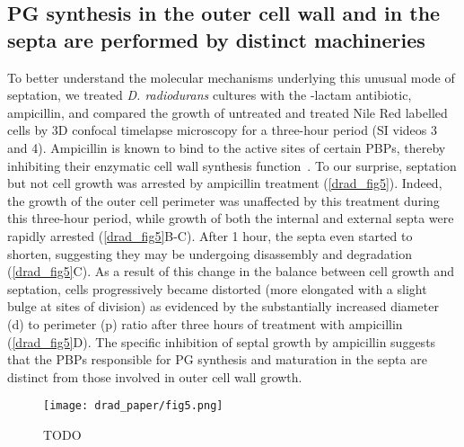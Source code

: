 \FloatBarrier

\subsection{PG synthesis in the outer cell wall and in the septa are performed by distinct machineries}

To better understand the molecular mechanisms underlying this unusual mode of septation, we treated \textit{D. radiodurans} cultures with the \beta-lactam antibiotic, ampicillin, and compared the growth of untreated and treated Nile Red labelled cells by 3D confocal timelapse microscopy for a three-hour period (SI videos 3 and 4).
Ampicillin is known to bind to the active sites of certain PBPs, thereby inhibiting their enzymatic cell wall synthesis function~\cite{sauvageGlycosyltransferasesTranspeptidasesPenicillinBinding2016}.
To our surprise, septation but not cell growth was arrested by ampicillin treatment (\autoref{drad_fig5}).
Indeed, the growth of the outer cell perimeter was unaffected by this treatment during this three-hour period, while growth of both the internal and external septa were rapidly arrested (\autoref{drad_fig5}B-C).
After 1 hour, the septa even started to shorten, suggesting they may be undergoing disassembly and degradation (\autoref{drad_fig5}C).
As a result of this change in the balance between cell growth and septation, cells progressively became distorted (more elongated with a slight bulge at sites of division) as evidenced by the substantially increased diameter (d) to perimeter (p) ratio after three hours of treatment with ampicillin (\autoref{drad_fig5}D).
The specific inhibition of septal growth by ampicillin suggests that the PBPs responsible for PG synthesis and maturation in the septa are distinct from those involved in outer cell wall growth.

\begin{figure}[ht]
    \centering
    \texttt{[image: drad\_paper/fig5.png]}
    \caption{TODO}
    \label{drad_fig5}
\end{figure}

